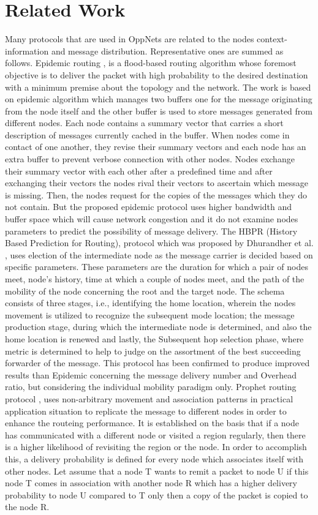 \documentclass[10pt,journal]{IEEEtran}
\begin{document}
\section{Related Work}
Many protocols that are used in OppNets are related to the nodes context-information and message distribution. Representative ones are summed as follows.
Epidemic routing \cite{2000epi}, is a flood-based routing algorithm whose foremost objective is to deliver the packet with high probability to the desired destination with a minimum premise about the topology and the network. The work is based on epidemic algorithm which manages two buffers one for the message originating from the node itself and the other buffer is used to store messages generated from different nodes. Each node contains a summary vector that carries a short description of messages currently cached in the buffer. When nodes come in contact of one another, they revise their summary vectors and each node has an extra buffer to prevent verbose connection with other nodes. Nodes exchange their summary vector with each other after a predefined time and after exchanging their vectors the nodes rival their vectors to ascertain which message is missing. Then, the nodes request for the copies of the messages which they do not contain. But the proposed epidemic protocol uses higher bandwidth and buffer space which will cause network congestion and it do not examine nodes parameters to predict the possibility of message delivery.
The HBPR (History Based Prediction for Routing), protocol which was proposed by Dhurandher et al. \cite{2004hbpr}, uses election of the intermediate node as the message carrier is decided based on specific parameters. These parameters are the duration for which a pair of nodes meet, node's history, time at which a couple of nodes meet, and the path of the mobility of the node concerning the root and the target node. The schema consists of three stages, i.e., identifying the home location, wherein the nodes movement is utilized to recognize the subsequent mode location; the message production stage, during which the intermediate node is determined, and also the home location is renewed and lastly, the Subsequent hop selection phase, where  metric is determined to help to judge on the assortment of the best succeeding forwarder of the message. This protocol has been confirmed to produce improved results than Epidemic concerning the message delivery number and Overhead ratio, but considering the individual mobility paradigm only.
Prophet routing protocol \cite{2003pric}, uses non-arbitrary movement and association patterns in practical application situation to replicate the message to different nodes in order to enhance the routeing performance. It is established on the basis that if a node has communicated with a different node or visited a region regularly, then there is a higher likelihood of revisiting the region or the node. In order to accomplish this, a delivery probability is defined for every node which associates itself with other nodes. Let assume that a node T wants to remit a packet to node U if this node T comes in association with another node  R  which has a higher delivery probability to node U compared to T  only then a  copy of the packet is copied to the node R.
\end{document}
